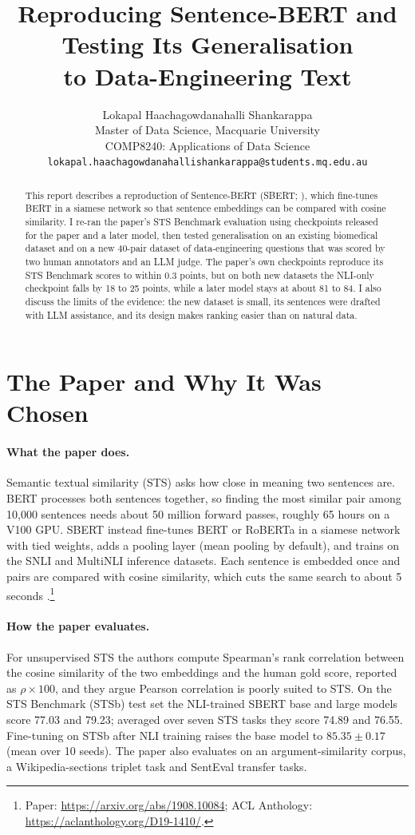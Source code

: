 \documentclass[11pt]{article}
\title{Reproducing Sentence-BERT and Testing Its Generalisation \\ to Data-Engineering Text}
\author{
  Lokapal Haachagowdanahalli Shankarappa \\
  Master of Data Science, Macquarie University \\
  COMP8240: Applications of Data Science \\
  \texttt{lokapal.haachagowdanahallishankarappa@students.mq.edu.au} \\
}
\begin{document}
\maketitle

\begin{abstract}
This report describes a reproduction of Sentence-BERT (SBERT; \citealp{reimers2019sentence}), which fine-tunes BERT in a siamese network so that sentence embeddings can be compared with cosine similarity. I re-ran the paper's STS Benchmark evaluation using checkpoints released for the paper and a later model, then tested generalisation on an existing biomedical dataset and on a new 40-pair dataset of data-engineering questions that was scored by two human annotators and an LLM judge. The paper's own checkpoints reproduce its STS Benchmark scores to within 0.3 points, but on both new datasets the NLI-only checkpoint falls by 18 to 25 points, while a later model stays at about 81 to 84. I also discuss the limits of the evidence: the new dataset is small, its sentences were drafted with LLM assistance, and its design makes ranking easier than on natural data.
\end{abstract}

\section{The Paper and Why It Was Chosen}
\label{sec:paper}

\paragraph{What the paper does.}
Semantic textual similarity (STS) asks how close in meaning two sentences are. BERT \citep{devlin2019bert} processes both sentences together, so finding the most similar pair among 10,000 sentences needs about 50 million forward passes, roughly 65 hours on a V100 GPU. SBERT instead fine-tunes BERT or RoBERTa in a siamese network with tied weights, adds a pooling layer (mean pooling by default), and trains on the SNLI and MultiNLI inference datasets. Each sentence is embedded once and pairs are compared with cosine similarity, which cuts the same search to about 5 seconds \citep{reimers2019sentence}.\footnote{Paper: \url{https://arxiv.org/abs/1908.10084}; ACL Anthology: \url{https://aclanthology.org/D19-1410/}.}

\paragraph{How the paper evaluates.}
For unsupervised STS the authors compute Spearman's rank correlation between the cosine similarity of the two embeddings and the human gold score, reported as $\rho \times 100$, and they argue Pearson correlation is poorly suited to STS. On the STS Benchmark (STSb) test set the NLI-trained SBERT base and large models score 77.03 and 79.23; averaged over seven STS tasks they score 74.89 and 76.55. Fine-tuning on STSb after NLI training raises the base model to $85.35 \pm 0.17$ (mean over 10 seeds). The paper also evaluates on an argument-similarity corpus, a Wikipedia-sections triplet task and SentEval transfer tasks.
\end{document}
